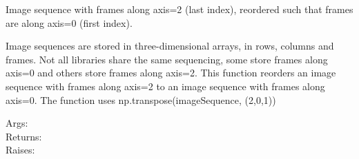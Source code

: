 \documentclass[a4paper,10pt,english]{sphinxmanual}
\begin{document}

\begin{fulllineitems}
\label{ryutils:pyradi.ryutils.framesFirst}
Image sequence with frames along axis=2 (last index), reordered such that 
frames are along axis=0 (first index).

Image sequences are stored in three-dimensional arrays, in rows, columns and frames.
Not all libraries share the same sequencing, some store frames along axis=0 and 
others store frames along axis=2.  This function reorders an image sequence with 
frames along axis=2  to an image sequence with frames along axis=0. The function
uses np.transpose(imageSequence, (2,0,1))
\begin{description}
\item[{Args:}] \leavevmode
{}

\item[{Returns:}] \leavevmode
{}

\item[{Raises:}] \leavevmode
{}

\end{description}

\end{fulllineitems}

\end{document}
